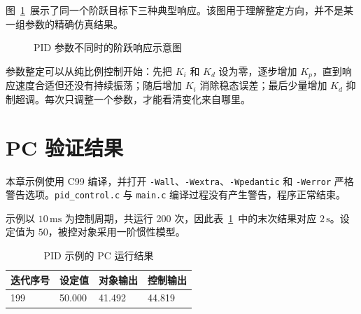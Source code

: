 图~\ref{fig:pid-step-response}~展示了同一个阶跃目标下三种典型响应。该图用于理解整定方向，并不是某一组参数的精确仿真结果。

\begin{figure}[htbp]
\centering
{}
\caption{PID 参数不同时的阶跃响应示意图} \label{fig:pid-step-response}
\end{figure}

参数整定可以从纯比例控制开始：先把 $K_i$ 和 $K_d$ 设为零，逐步增加 $K_p$，直到响应速度合适但还没有持续振荡；随后增加 $K_i$ 消除稳态误差；最后少量增加 $K_d$ 抑制超调。每次只调整一个参数，才能看清变化来自哪里。

\section{PC 验证结果}

本章示例使用 C99 编译，并打开 \texttt{-Wall}、\texttt{-Wextra}、\texttt{-Wpedantic} 和 \texttt{-Werror} 严格警告选项。\texttt{pid\_control.c} 与 \texttt{main.c} 编译过程没有产生警告，程序正常结束。

示例以 $10\,\mathrm{ms}$ 为控制周期，共运行 200 次，因此表~\ref{tab:pid-pc-result}~中的末次结果对应 $2\,\mathrm{s}$。设定值为 $50$，被控对象采用一阶惯性模型。

\begin{table}[htbp]
\centering
\caption{PID 示例的 PC 运行结果} \label{tab:pid-pc-result}
\begin{tabular}{llll}
\toprule
迭代序号 & 设定值 & 对象输出 & 控制输出 \\
\midrule
199 & 50.000 & 41.492 & 44.819 \\
\bottomrule
\end{tabular}
\end{table}


